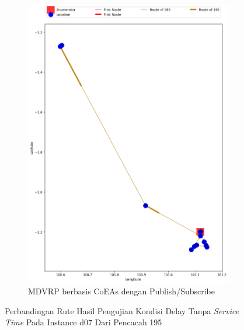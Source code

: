 \begin{figure}[H]\ContinuedFloat
	\centering
	\begin{subfigure}[t]{\textwidth}
		\centering
		\includegraphics[width=\textwidth]{Resources/Images/delayed_7/real_m15_n100_delayed_7_195_pubsub_coes}
		\caption{MDVRP berbasis CoEAs dengan Publish/Subscribe}
		\label{fig:real_m15_n100_delayed_7_195_pubsub_coes}
	\end{subfigure}
	\caption{Perbandingan Rute Hasil Pengujian Kondisi Delay Tanpa \textit{Service Time} Pada Instance d07 Dari Pencacah 195}
	\label{fig:real_m15_n100_delayed_7_195_contd}
\end{figure}



